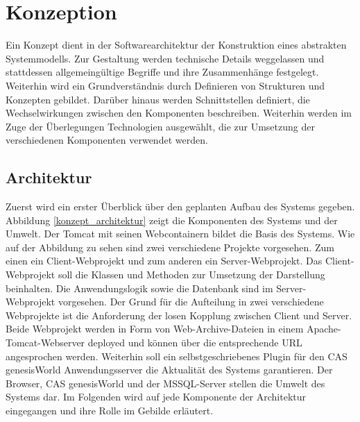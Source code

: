 
\chapter{Konzeption}
\label{ch:Konzeption}

Ein Konzept dient in der Softwarearchitektur der Konstruktion eines abstrakten Systemmodells. Zur Gestaltung werden technische Details weggelassen und stattdessen allgemeingültige Begriffe und ihre Zusammenhänge festgelegt. Weiterhin wird ein Grundverständnis durch Definieren von Strukturen und Konzepten gebildet. Darüber hinaus werden Schnittstellen definiert, die Wechselwirkungen zwischen den Komponenten beschreiben. Weiterhin werden im Zuge der Überlegungen Technologien ausgewählt, die zur Umsetzung der verschiedenen Komponenten verwendet werden.

\section{Architektur}
\label{ch:Konzeption:architektur}

Zuerst wird ein erster Überblick über den geplanten Aufbau des Systems gegeben. Abbildung \ref{konzept_architektur} zeigt die Komponenten des Systems und der Umwelt. Der Tomcat mit seinen Webcontainern bildet die Basis des Systems. Wie auf der Abbildung zu sehen sind zwei verschiedene Projekte vorgesehen. Zum einen ein Client-Webprojekt und zum anderen ein Server-Webprojekt. Das Client-Webprojekt soll die Klassen und Methoden zur Umsetzung der Darstellung beinhalten. Die Anwendungslogik sowie die Datenbank sind im Server-Webprojekt vorgesehen. Der Grund für die Aufteilung in zwei verschiedene Webprojekte ist die Anforderung der losen Kopplung zwischen Client und Server. Beide Webprojekt werden in Form von Web-Archive-Dateien in einem Apache-Tomcat-Webserver deployed und können über die entsprechende URL angesprochen werden. Weiterhin soll ein selbstgeschriebenes Plugin für den CAS genesisWorld Anwendungsserver die Aktualität des Systems garantieren. Der Browser, CAS genesisWorld und der MSSQL-Server stellen die Umwelt des Systems dar. Im Folgenden wird auf jede Komponente der Architektur eingegangen und ihre Rolle im Gebilde erläutert.

